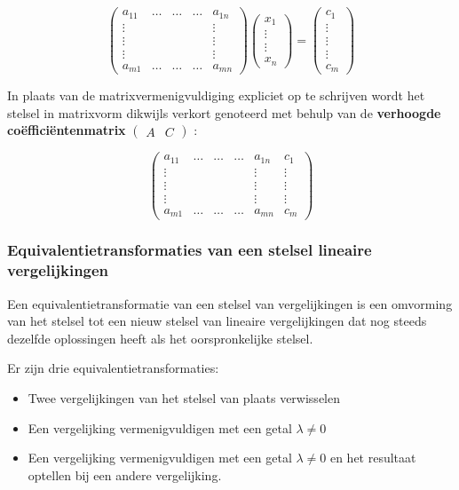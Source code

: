 \[ 
\left( \begin{matrix} a_{11} & \ldots & \ldots & \ldots & a_{1n} \\ \vdots & & & & \vdots \\ \vdots & & & & \vdots \\ \vdots & & & & \vdots \\ a_{m1} & \ldots & \ldots & \ldots & a_{mn} \end{matrix} \right) \left( \begin{matrix} x_1 \\ \vdots \\ \vdots \\ x_n \end{matrix} \right) = \left( \begin{matrix} c_1 \\ \vdots \\ \vdots \\ \vdots \\ c_m \end{matrix} \right)
\]

In plaats van de matrixvermenigvuldiging expliciet op te schrijven wordt het stelsel in matrixvorm dikwijls verkort genoteerd met behulp van de {\bf verhoogde co\"{e}ffici\"{e}ntenmatrix} $\left( \begin{array}{c|c} A & C \end{array} \right)$ : 

\[
\left( 
\begin{array}{ccccc|c}
a_{11} & \ldots & \ldots & \ldots & a_{1n} & c_1 \\ \vdots & & & & \vdots & \vdots \\ \vdots & & & & \vdots & \vdots \\ \vdots & & & & \vdots & \vdots \\ a_{m1} & \ldots & \ldots & \ldots & a_{mn} & c_m
\end{array} 
\right)
\]

\subsubsection{Equivalentietransformaties van een stelsel lineaire vergelijkingen}

Een equivalentietransformatie van een stelsel van vergelijkingen is een omvorming van het stelsel tot een nieuw stelsel van lineaire vergelijkingen dat nog steeds dezelfde oplossingen heeft als het oorspronkelijke stelsel. 

\begin{framed}
Er zijn drie equivalentietransformaties:

\begin{itemize}
	\item Twee vergelijkingen van het stelsel van plaats verwisselen
	\item Een vergelijking vermenigvuldigen met een getal $\lambda \neq 0$
	\item Een vergelijking vermenigvuldigen met een getal $\lambda \neq 0$ en het resultaat optellen bij een andere vergelijking.
\end{itemize}
\end{framed}

